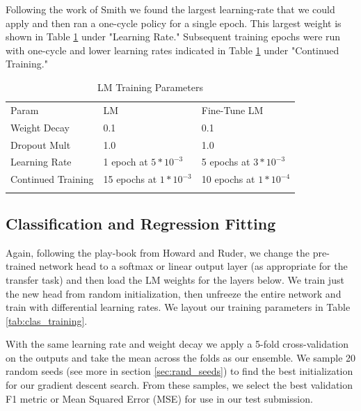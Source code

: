 \documentclass[runningheads]{llncs}
\begin{document}
Following the work of Smith\cite{Smith:DBLP:journals/corr/abs-1803-09820} we found the largest learning-rate that we could apply and then ran a one-cycle policy for a single epoch.  This largest weight is shown in Table \ref{tab:tab_training} under "Learning Rate." Subsequent training epochs were run with one-cycle and lower learning rates indicated in Table \ref{tab:tab_training} under "Continued Training."

\begin{table}[ht]
	\caption{LM Training Parameters}
	\label{tab:tab_training}       %
\begin{tabular}{lll}
	\hline\noalign{\smallskip}
	Param & LM & Fine-Tune LM \\
	\noalign{\smallskip}\hline\noalign{\smallskip}
	Weight Decay & 0.1 & 0.1 \\
	Dropout Mult & 1.0 & 1.0 \\
	Learning Rate & 1 epoch at $5*10^{-3}$ & 5 epochs at $3*10^{-3}$ \\
    Continued Training & 15 epochs at $1*10^{-3}$ & 10 epochs at $1*10^{-4}$\\
	\noalign{\smallskip}\hline
\end{tabular}
\end{table}

\subsection{Classification and Regression Fitting}
Again, following the play-book from Howard and Ruder\cite{HowardRuder:DBLP:journals/corr/abs-1801-06146}, we change the pre-trained network head to a softmax or linear output layer (as appropriate for the transfer task) and then load the LM weights for the layers below.  We train just the new head from random initialization, then unfreeze the entire network and train with differential learning rates.  We layout our training parameters in Table \ref{tab:clas_training}.

With the same learning rate and weight decay we apply a 5-fold cross-validation on the outputs and take the mean across the folds as our ensemble.  We sample 20 random seeds (see more in section \ref{sec:rand_seeds}) to find the best initialization for our gradient descent search.  From these samples, we select the best validation F1 metric or Mean Squared Error (MSE) for use in our test submission.
\end{document}
